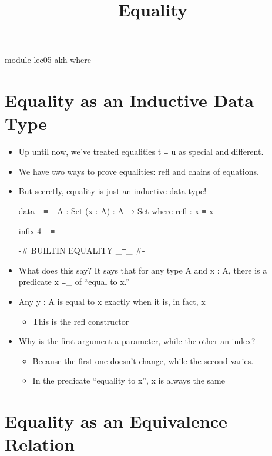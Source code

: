 \documentclass{lecturenotes}
\title{Equality}
\begin{document}
\maketitle

\begin{code}
module lec05-akh where
\end{code}

\section{Equality as an Inductive Data Type}
\label{sec:equality-inductive}

\begin{itemize}
\item Up until now, we've treated equalities \textsf{t ≡ u} as special and different.
\item We have two ways to prove equalities: \textsf{refl} and chains of equations.
\item But secretly, equality is just an inductive data type!
\begin{code}
data _≡_ {A : Set} (x : A) : A → Set where
  refl : x ≡ x

infix 4 _≡_

{-# BUILTIN EQUALITY _≡_ #-}
\end{code}
\item What does this say? It says that for any type \textsf{A} and \textsf{x : A}, there is a predicate \textsf{x ≡\_} of ``equal to \textsf{x}.''
\item Any \textsf{y : A} is equal to \textsf{x} exactly when it is, in fact, \textsf{x}
  \begin{itemize}
  \item This is the refl constructor
  \end{itemize}
\item Why is the first argument a parameter, while the other an index?
  \begin{itemize}
  \item Because the first one doesn't change, while the second varies.
  \item In the predicate ``equality to \textsf{x}'', \textsf{x} is always the same
  \end{itemize}
\end{itemize}

\section{Equality as an Equivalence Relation}
\label{sec:equality-as-an}
\end{document}
